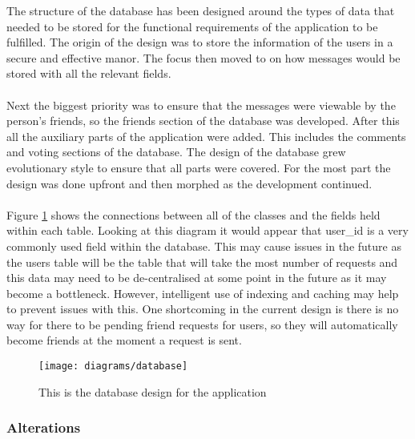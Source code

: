 The structure of the database has been designed around the types of data that needed to be stored for the functional requirements of the application to be fulfilled. The origin of the design was to store the information of the users in a secure and effective manor. The focus then moved to on how messages would be stored with all the relevant fields.\\
\\
Next the biggest priority was to ensure that the messages were viewable by the person's friends, so the friends section of the database was developed. After this all the auxiliary parts of the application were added. This includes the comments and voting sections of the database. The design of the database grew evolutionary style to ensure that all parts were covered. For the most part the design was done upfront and then morphed as the development continued.\\
\\
Figure \ref{fig:diagram_database_image} shows the connections between all of the classes and the fields held within each table. Looking at this diagram it would appear that user\_id is a very commonly used field within the database. This may cause issues in the future as the users table will be the table that will take the most number of requests and this data may need to be de-centralised at some point in the future as it may become a bottleneck. However, intelligent use of indexing and caching may help to prevent issues with this. One shortcoming in the current design is there is no way for there to be pending friend requests for users, so they will automatically become friends at the moment a request is sent.

\begin{figure}[H]
    \centering
    \texttt{[image: diagrams/database]}
    \caption{This is the database design for the application}
    \label{fig:diagram_database_image}
\end{figure} 

\subsubsection{Alterations}

